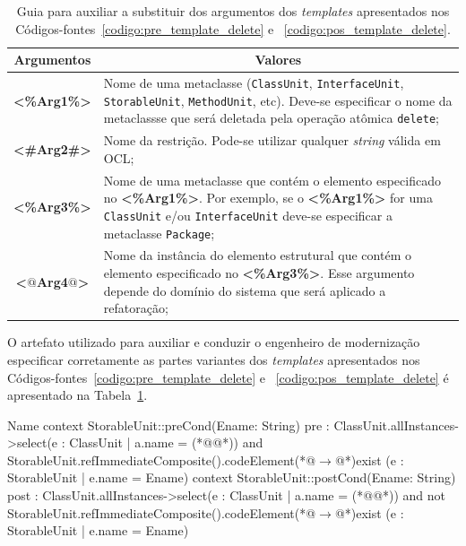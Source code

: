 \begin{table}[h]
\centering
\caption{Guia para auxiliar a substituir dos argumentos dos \textit{templates} apresentados nos Códigos-fontes~\ref{codigo:pre_template_delete} e ~\ref{codigo:pos_template_delete}.}
\label{tab:guia_template_pre_pos_delete}
\begin{tabular}{ | m{1.7cm} | m{12cm}| } 
\hline
\multicolumn{1}{|c|}{Argumentos}                                         & \multicolumn{1}{c|}{Valores} \\ \hline
\multicolumn{1}{|c|}{\textbf{<\%Arg1\%>}} & Nome de uma metaclasse (\texttt{ClassUnit}, \texttt{InterfaceUnit}, \texttt{StorableUnit}, \texttt{MethodUnit}, etc). Deve-se especificar o nome da metaclassse que será deletada pela operação atômica \texttt{delete}; \\ 
\hline
\multicolumn{1}{|c|}{\textbf{<\#Arg2\#>}} & Nome da restrição. Pode-se utilizar qualquer \textit{string} válida em OCL; \\ 
\hline
\multicolumn{1}{|c|}{\textbf{<\%Arg3\%>}} & Nome de uma metaclasse que contém o elemento especificado no \textbf{<\%Arg1\%>}. Por exemplo, se o \textbf{<\%Arg1\%>} for uma \texttt{ClassUnit} e/ou \texttt{InterfaceUnit} deve-se especificar a metaclasse \texttt{Package}; \\ 
\hline
\multicolumn{1}{|c|}{\textbf{<$@$Arg4$@$>}} & Nome da instância do elemento estrutural que contém o elemento especificado no \textbf{<\%Arg3\%>}. Esse argumento depende do domínio do sistema que será aplicado a refatoração; \\ 
\hline
\end{tabular}
\end{table}

O artefato utilizado para auxiliar e conduzir o engenheiro de modernização especificar corretamente as partes variantes dos \textit{templates} apresentados nos Códigos-fontes~\ref{codigo:pre_template_delete} e ~\ref{codigo:pos_template_delete} é apresentado na Tabela~\ref{tab:guia_template_pre_pos_delete}. 

\begin{codigo}[caption={[Asserções em OCL para realizar a operação atômica \texttt{delete}.] Asserções em OCL para realizar a operação atômica \texttt{delete}.},escapeinside={(*@}{@*)}, basicstyle=\footnotesize, label={codigo:template_assercao_juntado_delete}, language=OCL]{Name}
context StorableUnit::preCond(Ename: String)
pre : ClassUnit.allInstances->select(e : ClassUnit | a.name = (*@@*)) and StorableUnit.refImmediateComposite().codeElement(*@$\rightarrow$@*)exist (e : StorableUnit | e.name = Ename)
context StorableUnit::postCond(Ename: String)
post : ClassUnit.allInstances->select(e : ClassUnit | a.name = (*@@*)) and  not StorableUnit.refImmediateComposite().codeElement(*@$\rightarrow$@*)exist (e : StorableUnit | e.name = Ename)
\end{codigo}

